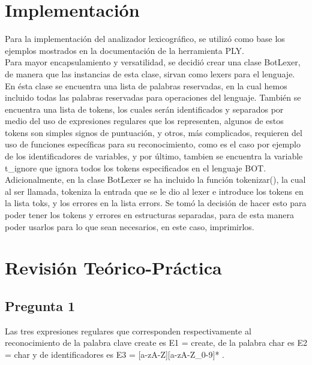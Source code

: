 \documentclass{article}
\begin{document}
\section{Implementación}
\hspace{0.5cm} Para la implementación del analizador lexicográfico, se utilizó como base los ejemplos mostrados en la documentación de la herramienta PLY. \\

Para mayor encapsulamiento y versatilidad, se decidió crear una clase BotLexer, de manera que las instancias de esta clase, sirvan como lexers para el lenguaje. En ésta clase se encuentra una lista de palabras reservadas, en la cual hemos incluido todas las palabras reservadas para operaciones del lenguaje. También se encuentra una lista de tokens, los cuales serán identificados y separados por medio del uso de expresiones regulares que los representen, algunos de estos tokens son simples signos de puntuación, y otros, más complicados, requieren del uso de funciones específicas para su reconocimiento, como es el caso por ejemplo de los identificadores de variables, y por último, tambien se encuentra la variable t\_ignore que ignora todos los tokens especificados en el lenguaje BOT. \\

Adicionalmente, en la clase BotLexer se ha incluido la función tokenizar(), la cual al ser llamada, tokeniza la entrada que se le dio al lexer e introduce los tokens en la lista toks, y los errores en la lista errors. Se tomó la decisión de hacer esto para poder tener los tokens y errores en estructuras separadas, para de esta manera poder usarlos para lo que sean necesarios, en este caso, imprimirlos.

\newpage

\section{Revisión Teórico-Práctica}
\subsection{Pregunta 1}
\hspace{0.5cm} Las tres expresiones regulares que corresponden respectivamente al reconocimiento de la palabra clave create es E1 = create, de la palabra char es E2 = char y de identificadores es E3 = [a-zA-Z][a-zA-Z\_0-9]* . 
\end{document}
